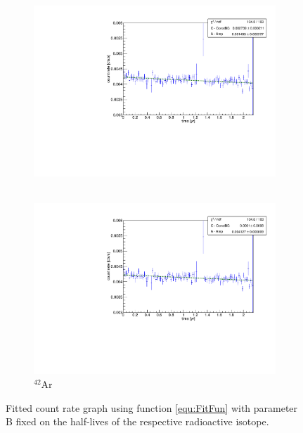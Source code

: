 \documentclass[encoding=utf8,british]{tumphthesis}
\begin{document}
\begin{figure}[t!]
	\centering
	\begin{subfigure}[t]{.475\textwidth}
		\centering
		\includegraphics[width=\textwidth]{./Bilder/eventRateFit.pdf}
		\caption{ \Kr\ }
		\label{fig:eventRateFit}
	\end{subfigure}\hfill%
	\begin{subfigure}[t]{.475\textwidth}
		\centering
		\includegraphics[width=\textwidth]{./Bilder/Argon.pdf}
		\caption{
		$^{42}$Ar
		}
		\label{fig:Argon}
	\end{subfigure}
	\caption{Fitted count rate graph using function \ref{equ:FitFun} with parameter B fixed on the half-lives of the respective radioactive isotope.}
		\label{fig:fit2}
		\vspace{5mm}
\end{figure}
\end{document}
